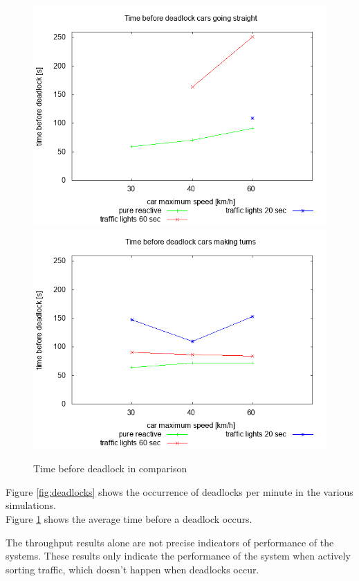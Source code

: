 \begin{figure}
\centering
\includegraphics[scale=0.35]{img/plot_dtimestraight}
\includegraphics[scale=0.35]{img/plot_dtimeturns}
\caption{Time before deadlock in comparison}
\label{fig:dtime}
\end{figure}

Figure \ref{fig:deadlocks} shows the occurrence of deadlocks per minute in the various simulations.\\
Figure \ref{fig:dtime} shows the average time before a deadlock occurs.
\newline

The throughput results alone are not precise indicators of performance of the systems.
These results only indicate the performance of the system when actively sorting traffic, which doesn't happen when deadlocks occur.

